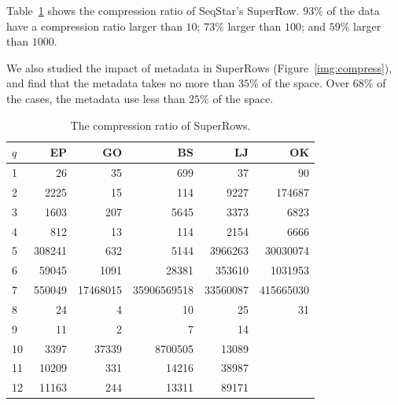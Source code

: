 Table~\ref{tab:compression_ratio} shows the compression ratio of SeqStar's SuperRow.
$93\%$ of the data have a compression ratio larger than $10$;
$73\%$ larger than $100$; and $59\%$ larger than $1000$.

We also studied the impact of metadata in SuperRows (Figure~\ref{img:compress}),
and find that the metadata takes no more than $35\%$ of the space.
Over $68\%$ of the cases, the metadata use less than $25\%$ of the space.

\begin{table}
  \caption{The compression ratio of SuperRows.}\label{tab:compression_ratio}
  \begin{tabular}{lrrrrr}
    \toprule
    $q$ &     EP &       GO &          BS &       LJ &        OK \\
    \midrule
    1  &     26 &       35 &         699 &       37 &        90 \\
    2  &   2225 &       15 &         114 &     9227 &    174687 \\
    3  &   1603 &      207 &        5645 &     3373 &      6823 \\
    4  &    812 &       13 &         114 &     2154 &      6666 \\
    5  & 308241 &      632 &        5144 &  3966263 &  30030074 \\
    6  &  59045 &     1091 &       28381 &   353610 &   1031953 \\
    7  & 550049 & 17468015 & 35906569518 & 33560087 & 415665030 \\
    8  &     24 &        4 &          10 &       25 &        31 \\
    9  &     11 &        2 &           7 &       14 &        \\
    10 &   3397 &    37339 &     8700505 &    13089 &        \\
    11 &  10209 &      331 &       14216 &    38987 &        \\
    12 &  11163 &      244 &       13311 &    89171 &        \\
    \bottomrule
  \end{tabular}
\end{table}


